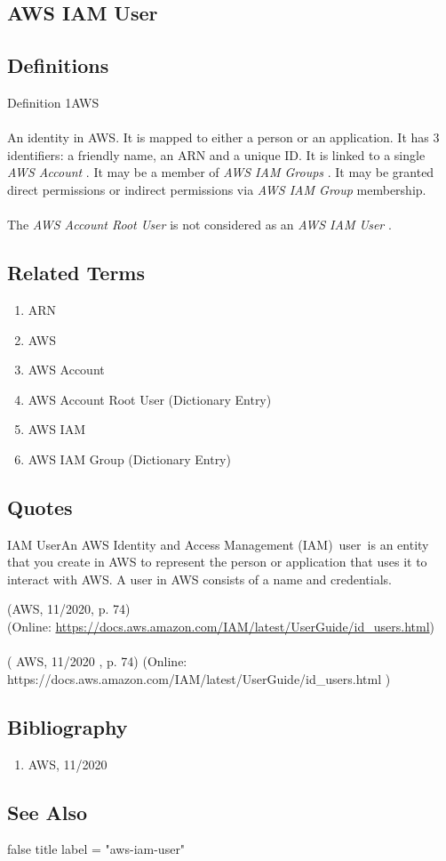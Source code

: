 \newpage \subsection*{AWS IAM User } \subsection*{Definitions } \begin{DIC_Def}{Definition 1AWS }{} \paragraph{} An identity in AWS. It is mapped to either a person or an application. It has 3 identifiers: a friendly name, an ARN and a unique ID. It is linked to a single  \emph{ AWS Account  } . It may be a member of  \emph{ AWS IAM Groups  } . It may be granted direct permissions or indirect permissions via  \emph{ AWS IAM Group  } membership.  \paragraph{} The  \emph{ AWS Account Root User  } is not considered as an  \emph{ AWS IAM User  } .  \end{DIC_Def} \subsection*{Related Terms } \begin{enumerate} \item  ARN  \item  AWS  \item  AWS Account  \item  AWS Account Root User (Dictionary Entry)    \item  AWS IAM  \item  AWS IAM Group (Dictionary Entry)    \end{enumerate} \subsection*{Quotes } \begin{DIC_BlockQuote} IAM UserAn AWS Identity and Access Management (IAM)~user~is an entity that you create in AWS to represent the person or application that uses it to interact with AWS. A user in AWS consists of a name and credentials.  \end{DIC_BlockQuote} (AWS, 11/2020, p. 74)\\ (Online: \url{https://docs.aws.amazon.com/IAM/latest/UserGuide/id_users.html})  \paragraph{} (  AWS, 11/2020  , p. 74)  (Online:  https://docs.aws.amazon.com/IAM/latest/UserGuide/id\_users.html  )  \subsection*{Bibliography } \begin{enumerate} \item  AWS, 11/2020    \end{enumerate} \subsection*{See Also } false  title  label = "aws-iam-user"  